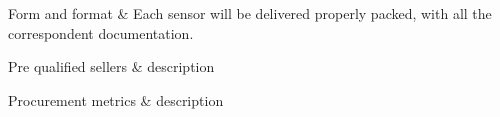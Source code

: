 \begin{table}[H]
\begin{tabular}
		Form and format & Each sensor will be delivered properly packed, with all the correspondent documentation.\\
		\hline
		
		Pre qualified sellers & description\\
		\hline
		
		Procurement metrics & description\\
		
		\bottomrule[2pt]		
		
	\end{tabular}
\end{table}


